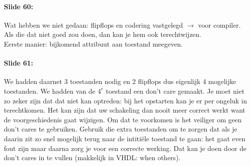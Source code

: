 \documentclass[10pt,a4paper]{book}
\begin{document}
\paragraph{Slide 60:} Wat hebben we niet gedaan: flipflops en codering vastgelegd $\rightarrow$ voor compiler. Als die dat niet goed zou doen, dan kan je hem ook terechtwijzen.\\
Eerste manier: bijkomend attribuut aan toestand meegeven. 

\paragraph{Slide 61:} We hadden daarnet 3 toestanden nodig en 2 flipflops dus eigenlijk 4 mogelijke toestanden. We hadden van de $4^e$ toestand een don't care gemaakt. Je moet niet zo zeker zijn dat dat niet kan optreden: bij het opstarten kan je er per ongeluk in terechtkomen. Het kan zijn dat uw schakeling dan nooit meer correct werkt want de voorgeschiedenis gaat wijzigen. Om dat te voorkomen is het veiliger om geen don't cares te gebruiken. Gebruik die extra toestanden om te zorgen dat als je daarin zit zo snel mogelijk terug naar de intiti\"ele toestand te gaan: het gaat even fout zijn maar daarna zorg je voor een correcte werking.
Dat kan je doen door de don't cares in te vullen (makkelijk in VHDL: when others).
\end{document}
